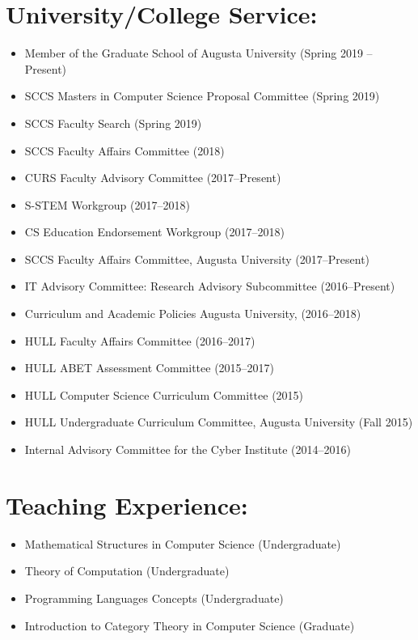 \documentclass[11pt]{article}
\begin{document}

\section{University/College Service:}
\label{sec:universitycollege_service:}
\begin{itemize}
\item Member of the Graduate School of Augusta University (Spring 2019 -- Present)
\item SCCS Masters in Computer Science Proposal Committee (Spring 2019)
\item SCCS Faculty Search (Spring 2019)
\item SCCS Faculty Affairs Committee (2018)
\item CURS Faculty Advisory Committee (2017--Present)
\item S-STEM Workgroup (2017--2018)
\item CS Education Endorsement Workgroup (2017--2018)
\item SCCS Faculty Affairs Committee, Augusta University (2017--Present)
\item IT Advisory Committee: Research Advisory Subcommittee (2016--Present)
\item Curriculum and Academic Policies Augusta University, (2016--2018)
\item HULL Faculty Affairs Committee (2016--2017)
\item HULL ABET Assessment Committee (2015--2017)
\item HULL Computer Science Curriculum Committee (2015)
\item HULL Undergraduate Curriculum Committee, Augusta University (Fall 2015)
\item Internal Advisory Committee for the Cyber Institute (2014--2016)
\end{itemize}


\section{Teaching Experience:}
\label{sec:teaching_experience:}
\begin{itemize}
\item Mathematical Structures in Computer Science (Undergraduate)
\item Theory of Computation (Undergraduate)
\item Programming Languages Concepts (Undergraduate)  
\item Introduction to Category Theory in Computer Science (Graduate)
\end{itemize}
\end{document}
